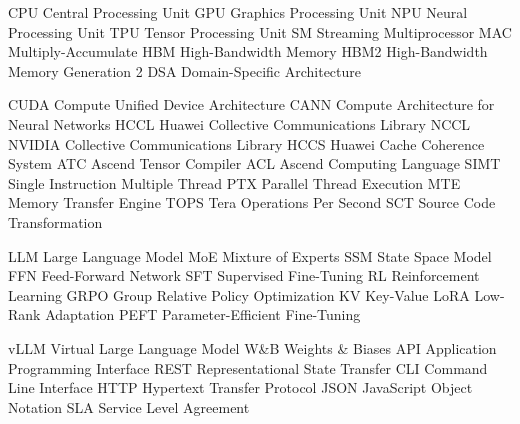 
   {CPU}   {Central Processing Unit}
   {GPU}   {Graphics Processing Unit}
   {NPU}   {Neural Processing Unit}
   {TPU}   {Tensor Processing Unit}
    {SM}    {Streaming Multiprocessor}
   {MAC}   {Multiply-Accumulate}
   {HBM}   {High-Bandwidth Memory}
  {HBM2}  {High-Bandwidth Memory Generation 2}
   {DSA}   {Domain-Specific Architecture}

  {CUDA}  {Compute Unified Device Architecture}
  {CANN}  {Compute Architecture for Neural Networks}
  {HCCL}  {Huawei Collective Communications Library}
  {NCCL}  {NVIDIA Collective Communications Library}
  {HCCS}  {Huawei Cache Coherence System}
   {ATC}   {Ascend Tensor Compiler}
   {ACL}   {Ascend Computing Language}
  {SIMT}  {Single Instruction Multiple Thread}
   {PTX}   {Parallel Thread Execution}
   {MTE}   {Memory Transfer Engine}
  {TOPS}  {Tera Operations Per Second}
   {SCT}   {Source Code Transformation}

   {LLM}   {Large Language Model}
   {MoE}   {Mixture of Experts}
   {SSM}   {State Space Model}
   {FFN}   {Feed-Forward Network}
   {SFT}   {Supervised Fine-Tuning}
    {RL}    {Reinforcement Learning}
  {GRPO}  {Group Relative Policy Optimization}
    {KV}    {Key-Value}
  {LoRA}  {Low-Rank Adaptation}
  {PEFT}  {Parameter-Efficient Fine-Tuning}

  {vLLM}  {Virtual Large Language Model}
 {W\&B}  {Weights \& Biases}
   {API}   {Application Programming Interface}
  {REST}  {Representational State Transfer}
   {CLI}   {Command Line Interface}
  {HTTP}  {Hypertext Transfer Protocol}
  {JSON}  {JavaScript Object Notation}
   {SLA}   {Service Level Agreement}

